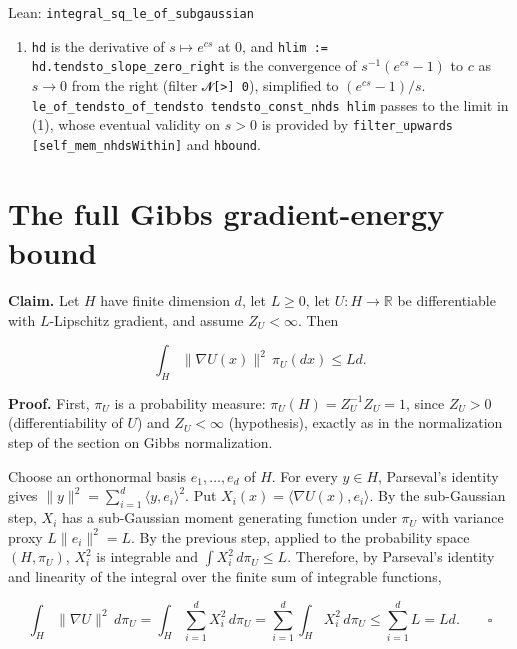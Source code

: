\documentclass[11pt,a4paper]{article}
\begin{document}
\begin{leanbox}{Lean: \texttt{integral\_\allowbreak{}sq\_\allowbreak{}le\_\allowbreak{}of\_\allowbreak{}subgaussian}}
\begin{enumerate}
\item \texttt{hd} is the derivative of \(s\mapsto e^{cs}\) at \(0\), and \texttt{hlim := hd.\allowbreak{}tendsto\_\allowbreak{}slope\_\allowbreak{}zero\_\allowbreak{}right} is the convergence of \(s^{-1}(e^{cs}-1)\) to \(c\) as \(s\to0\) from the right (filter \texttt{{\leanfallback 𝓝}[>] 0}), simplified to \((e^{cs}-1)/s\). \texttt{le\_\allowbreak{}of\_\allowbreak{}tendsto\_\allowbreak{}of\_\allowbreak{}tendsto tendsto\_\allowbreak{}const\_\allowbreak{}nhds hlim} passes to the limit in (1), whose eventual validity on \(s>0\) is provided by \texttt{filter\_\allowbreak{}upwards [self\_\allowbreak{}mem\_\allowbreak{}nhds\allowbreak{}Within]} and \texttt{hbound}.

\end{enumerate}
\end{leanbox}

\section{\texorpdfstring{The full Gibbs gradient-energy bound}{The full Gibbs gradient-energy bound}}


\textbf{Claim.} Let \(H\) have finite dimension \(d\), let \(L\ge0\), let \(U:H\to\mathbb R\) be differentiable with \(L\)-Lipschitz gradient, and assume \(Z_U<\infty\). Then


\[\int_H\|\nabla U(x)\|^2\,\pi_U(dx)\le Ld.\]


\textbf{Proof.} First, \(\pi_U\) is a probability measure: \(\pi_U(H)=Z_U^{-1}Z_U=1\), since \(Z_U>0\) (differentiability of \(U\)) and \(Z_U<\infty\) (hypothesis), exactly as in the normalization step of the section on Gibbs normalization.




Choose an orthonormal basis \(e_1,\dots,e_d\) of \(H\). For every \(y\in H\), Parseval's identity gives \(\|y\|^2=\sum_{i=1}^d\langle y,e_i\rangle^2\). Put \(X_i(x)=\langle\nabla U(x),e_i\rangle\). By the sub-Gaussian step, \(X_i\) has a sub-Gaussian moment generating function under \(\pi_U\) with variance proxy \(L\|e_i\|^2=L\). By the previous step, applied to the probability space \((H,\pi_U)\), \(X_i^2\) is integrable and \(\int X_i^2\,d\pi_U\le L\). Therefore, by Parseval's identity and linearity of the integral over the finite sum of integrable functions,


\[\int_H\|\nabla U\|^2\,d\pi_U=\int_H\sum_{i=1}^dX_i^2\,d\pi_U=\sum_{i=1}^d\int_HX_i^2\,d\pi_U\le\sum_{i=1}^dL=Ld.\qquad\square\]
\end{document}
